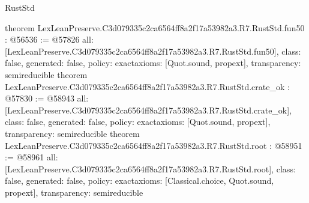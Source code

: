 \begin{lexlean}{RustStd}
\begin{coremodule}
{}
theorem LexLeanPreserve.C3d079335c2ca6564ff8a2f17a53982a3.R7.RustStd.fun50 : @56536 := @57826 {
  all: [LexLeanPreserve.C3d079335c2ca6564ff8a2f17a53982a3.R7.RustStd.fun50],
  class: false,
  generated: false,
  policy: exact{axioms: [Quot.sound, propext]},
  transparency: semireducible
}
theorem LexLeanPreserve.C3d079335c2ca6564ff8a2f17a53982a3.R7.RustStd.crate_ok : @57830 := @58943 {
  all: [LexLeanPreserve.C3d079335c2ca6564ff8a2f17a53982a3.R7.RustStd.crate_ok],
  class: false,
  generated: false,
  policy: exact{axioms: [Quot.sound, propext]},
  transparency: semireducible
}
theorem LexLeanPreserve.C3d079335c2ca6564ff8a2f17a53982a3.R7.RustStd.root : @58951 := @58961 {
  all: [LexLeanPreserve.C3d079335c2ca6564ff8a2f17a53982a3.R7.RustStd.root],
  class: false,
  generated: false,
  policy: exact{axioms: [Classical.choice, Quot.sound, propext]},
  transparency: semireducible
}


\end{coremodule}
\end{lexlean}
